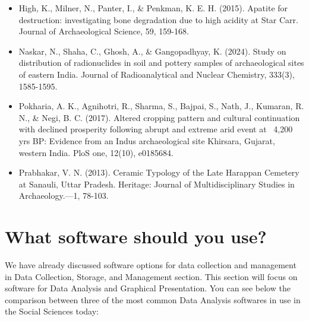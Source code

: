 \documentclass{article}
\begin{document}
\begin{itemize}
    \item \hypertarget{high}{High, K., Milner, N., Panter, I., \& Penkman, K. E. H. (2015). Apatite for destruction: investigating bone degradation due to high acidity at Star Carr. Journal of Archaeological Science, 59, 159-168.}
    \item \hypertarget{naskar}{Naskar, N., Shaha, C., Ghosh, A., \& Gangopadhyay, K. (2024). Study on distribution of radionuclides in soil and pottery samples of archaeological sites of eastern India. Journal of Radioanalytical and Nuclear Chemistry, 333(3), 1585-1595.}
    \item \hypertarget{pokharia}{Pokharia, A. K., Agnihotri, R., Sharma, S., Bajpai, S., Nath, J., Kumaran, R. N., \& Negi, B. C. (2017). Altered cropping pattern and cultural continuation with declined prosperity following abrupt and extreme arid event at~ 4,200 yrs BP: Evidence from an Indus archaeological site Khirsara, Gujarat, western India. PloS one, 12(10), e0185684.}
    \item \hypertarget{prabhakar}{Prabhakar, V. N. (2013). Ceramic Typology of the Late Harappan Cemetery at Sanauli, Uttar Pradesh. Heritage: Journal of Multidisciplinary Studies in Archaeology.—1, 78-103.}
\end{itemize}

\newpage
\section{What software should you use?}
We have already discussed software options for data collection and management in Data Collection, Storage, and Management section. This section will focus on software for Data Analysis and Graphical Presentation. You can see below the comparison between three of the most common Data Analysis softwares in use in the Social Sciences today:

\vspace{0.5cm}
\end{document}

